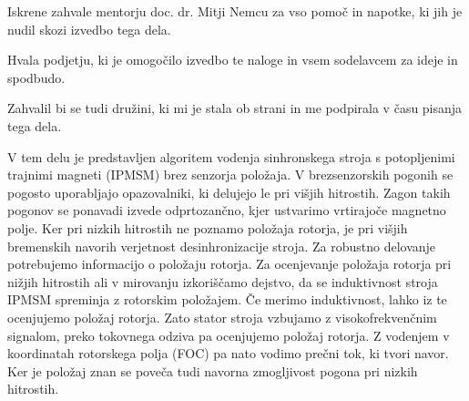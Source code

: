 \documentclass[a4paper,twoside,openright,12pt,slovene]{book}
\date{Ljubljana, \the\year}
\begin{document}
\frontmatter








\maketitle

\zahvala

Iskrene zahvale mentorju doc. dr. Mitji Nemcu za vso pomoč in napotke, ki jih je nudil skozi izvedbo tega dela. 

Hvala podjetju, ki je omogočilo izvedbo te naloge in vsem sodelavcem za ideje in spodbudo.

Zahvalil bi se tudi družini, ki mi je stala ob strani in me podpirala v času pisanja tega dela.

\povzetek

V tem delu je predstavljen algoritem vodenja sinhronskega stroja s potopljenimi trajnimi magneti (IPMSM) brez senzorja položaja. V brezsenzorskih pogonih se pogosto uporabljajo opazovalniki, ki delujejo 
le pri višjih hitrostih. Zagon takih pogonov se ponavadi izvede odprtozančno, kjer ustvarimo vrtirajoče magnetno polje. Ker pri nizkih hitrostih ne poznamo položaja rotorja, je pri višjih bremenskih navorih
verjetnost desinhronizacije stroja. Za robustno delovanje potrebujemo informacijo o položaju rotorja. 
Za ocenjevanje položaja rotorja pri nižjih hitrostih ali v mirovanju izkoriščamo dejstvo, da se induktivnost stroja IPMSM spreminja z rotorskim položajem. Če merimo induktivnost, 
lahko iz te ocenjujemo položaj rotorja. Zato stator stroja vzbujamo z visokofrekvenčnim signalom, preko tokovnega odziva pa ocenjujemo položaj rotorja. Z vodenjem v koordinatah rotorskega polja (FOC) pa nato 
vodimo prečni tok, ki tvori navor. Ker je položaj znan se poveča tudi navorna zmogljivost pogona pri nizkih hitrostih.
\end{document}
